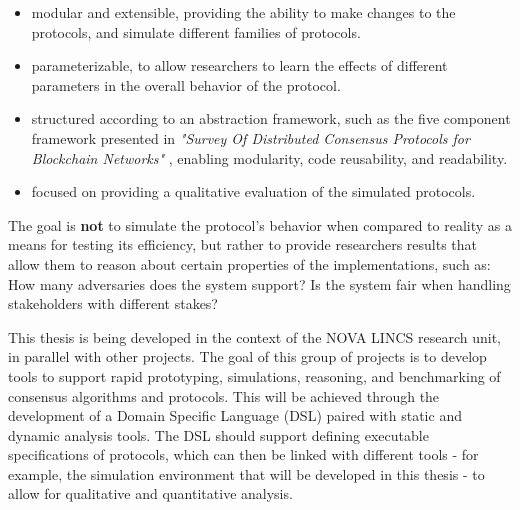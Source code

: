 \begin{itemize}
  \item modular and extensible, providing the ability to make changes to the protocols, and simulate different families of protocols.
  \item parameterizable, to allow researchers to learn the effects of different parameters in the overall behavior of the protocol.
  \item structured according to an abstraction framework, such as the five component framework presented in \textit{"Survey Of Distributed Consensus Protocols for Blockchain Networks"} \cite{survey_bchain_networks}, enabling modularity, code reusability, and readability.
  \item focused on providing a qualitative evaluation of the simulated protocols.
\end{itemize}

The goal is \textbf{not} to simulate the protocol's behavior when compared to reality as a means for testing its efficiency, but rather to provide researchers results that allow them to reason about certain properties of the implementations, such as: How many adversaries does the system support? Is the system fair when handling stakeholders with different stakes?

\vspace{0.5cm}

This thesis is being developed in the context of the NOVA LINCS research unit, in parallel with other projects. The goal of this group of projects is to develop tools to support rapid prototyping, simulations, reasoning, and benchmarking of consensus algorithms and protocols. This will be achieved through the development of a Domain Specific Language (DSL) paired with static and dynamic analysis tools. The DSL should support defining executable specifications of protocols, which can then be linked with different tools - for example, the simulation environment that will be developed in this thesis - to allow for qualitative and quantitative analysis.




